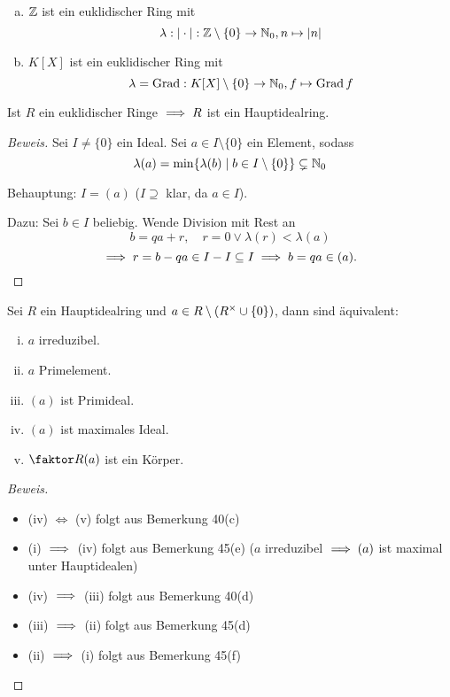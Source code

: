 \documentclass[a4paper]{report}
\begin{document}
\begin{bsp}
\begin{enumerate}[(a)]
  \item $\mathbb{Z}$ ist ein euklidischer Ring mit \[\lambda : | \cdot | : \mathbb{Z} \setminus \{0\} \to \mathbb{N}_0, n \mapsto |n|\]
  \item $K[X]$ ist ein euklidischer Ring mit \[\lambda = \operatorname{Grad} : K[X] \setminus \{0\} \to \mathbb{N}_0, f \mapsto \operatorname{Grad} f\]
\end{enumerate}
\end{bsp}

\begin{prop}
  Ist $R$ ein euklidischer Ringe $\implies R$ ist ein Hauptidealring.
  \begin{proof}[Beweis]
    Sei $I \ne \{0\}$ ein Ideal. Sei $a \in I \setminus \{0\}$ ein Element, sodass \[\lambda(a) = \min \{\lambda(b) \mid b \in I \setminus \{0\}\} \subsetneq \mathbb{N}_0 \]
    \item Behauptung: $I = (a)$ ($I \supseteq$ klar, da $a \in I$).
    \item Dazu: Sei $b \in I$ beliebig. Wende Division mit Rest an
    \[b = qa + r, \quad r = 0 \vee \lambda(r) < \lambda(a)\]
    \[\implies r = b - qa \in I - I \subseteq I \implies b = qa \in (a). \qedhere\]
  \end{proof}
\end{prop}

\begin{prop}
  Sei $R$ ein Hauptidealring und $a \in R \setminus (R^\times \cup \{0\})$, dann sind äquivalent:
  \begin{enumerate}[(i)]
    \item $a$ irreduzibel.
    \item $a$ Primelement.
    \item $(a)$ ist Primideal.
    \item $(a)$ ist maximales Ideal.
    \item $\fak R{(a)}$ ist ein Körper.
  \end{enumerate}
  \begin{proof}[Beweis]
    \begin{itemize}
\item (iv) $\iff$ (v) folgt aus Bemerkung 40(c)
\item (i) $\implies$ (iv) folgt aus Bemerkung 45(e) ($a$ irreduzibel $\implies (a)$ ist maximal unter Hauptidealen)
\item (iv) $\implies$ (iii) folgt aus Bemerkung 40(d)
\item (iii) $\implies$ (ii) folgt aus Bemerkung 45(d)
\item (ii) $\implies$ (i) folgt aus Bemerkung 45(f)
    \end{itemize}
\end{proof}
\end{prop}
\end{document}
